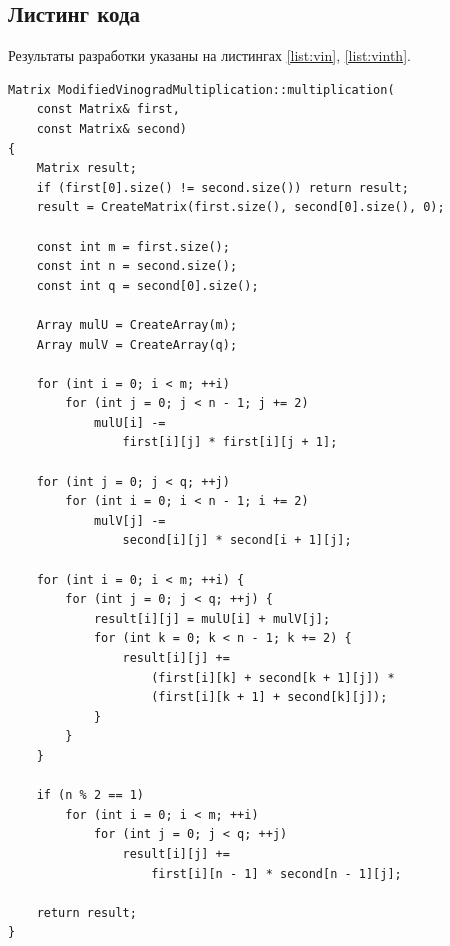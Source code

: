\documentclass[a4paper,12pt]{article}
\begin{document}
\subsection{Листинг кода}

Результаты разработки указаны на листингах \ref{list:vin}, \ref{list:vinth}.

\begin{lstlisting}[caption=Алгоритм Винограда умножения матриц,label=vin]
Matrix ModifiedVinogradMultiplication::multiplication(
    const Matrix& first,
    const Matrix& second)
{
    Matrix result;
    if (first[0].size() != second.size()) return result;
    result = CreateMatrix(first.size(), second[0].size(), 0);

    const int m = first.size();
    const int n = second.size();
    const int q = second[0].size();

    Array mulU = CreateArray(m);
    Array mulV = CreateArray(q);

    for (int i = 0; i < m; ++i)
        for (int j = 0; j < n - 1; j += 2)
            mulU[i] -=
                first[i][j] * first[i][j + 1];

    for (int j = 0; j < q; ++j)
        for (int i = 0; i < n - 1; i += 2)
            mulV[j] -=
                second[i][j] * second[i + 1][j];

    for (int i = 0; i < m; ++i) {
        for (int j = 0; j < q; ++j) {
            result[i][j] = mulU[i] + mulV[j];
            for (int k = 0; k < n - 1; k += 2) {
                result[i][j] +=
                    (first[i][k] + second[k + 1][j]) *
                    (first[i][k + 1] + second[k][j]);
            }
        }
    }

    if (n % 2 == 1)
        for (int i = 0; i < m; ++i)
            for (int j = 0; j < q; ++j)
                result[i][j] +=
                    first[i][n - 1] * second[n - 1][j];

    return result;
}
\end{lstlisting}
\end{document}
